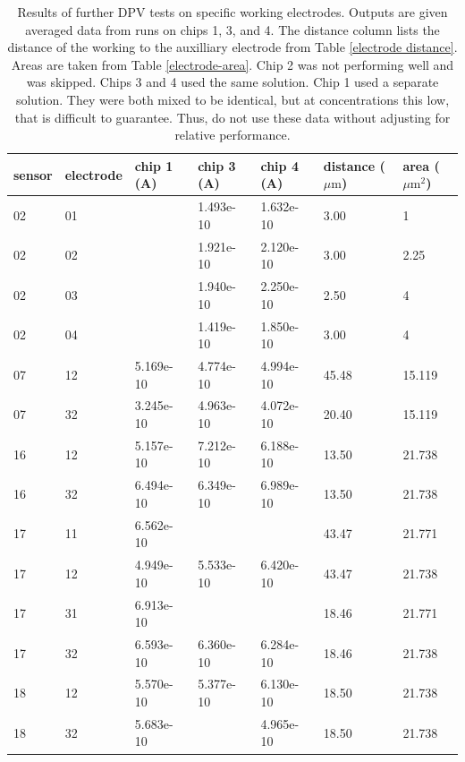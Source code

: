 \begin{table}
	\begin{tabular}{lllllll}
		sensor & electrode & chip 1 (A) & chip 3 (A) & chip 4 (A) & distance ($\mu \mathrm{m}$) & area ($\mu \mathrm{m}^2$) \\
		\hline
		02 & 01 &           & 1.493e-10 & 1.632e-10 &  3.00 & 1 \\
		02 & 02 &           & 1.921e-10 & 2.120e-10 &  3.00 & 2.25 \\
		02 & 03 &           & 1.940e-10 & 2.250e-10 &  2.50 & 4 \\
		02 & 04 &           & 1.419e-10 & 1.850e-10 &  3.00 & 4 \\
		07 & 12 & 5.169e-10 & 4.774e-10 & 4.994e-10 & 45.48 & 15.119 \\
		07 & 32 & 3.245e-10 & 4.963e-10 & 4.072e-10 & 20.40 & 15.119 \\
		16 & 12 & 5.157e-10 & 7.212e-10 & 6.188e-10 & 13.50 & 21.738 \\
		16 & 32 & 6.494e-10 & 6.349e-10 & 6.989e-10 & 13.50 & 21.738 \\
		17 & 11 & 6.562e-10 &           &           & 43.47 & 21.771 \\
		17 & 12 & 4.949e-10 & 5.533e-10 & 6.420e-10 & 43.47 & 21.738 \\
		17 & 31 & 6.913e-10 &           &           & 18.46 & 21.771 \\
		17 & 32 & 6.593e-10 & 6.360e-10 & 6.284e-10 & 18.46 & 21.738 \\
		18 & 12 & 5.570e-10 & 5.377e-10 & 6.130e-10 & 18.50 & 21.738 \\
		18 & 32 & 5.683e-10 &           & 4.965e-10 & 18.50 & 21.738
	\end{tabular}
	\caption[Results of further DPV tests on specific working electrodes.]{Results of further DPV tests on specific working electrodes. Outputs are given averaged data from runs on chips 1, 3, and 4. The distance column lists the distance of the working to the auxilliary electrode from Table \ref{electrode distance}. Areas are taken from Table \ref{electrode-area}. Chip 2 was not performing well and was skipped. Chips 3 and 4 used the same solution. Chip 1 used a separate solution. They were both mixed to be identical, but at concentrations this low, that is difficult to guarantee. Thus, do not use these data without adjusting for relative performance.}
	\label{dpv-specific}
\end{table}

